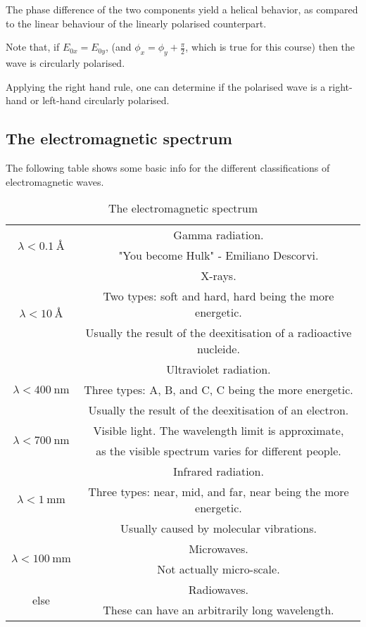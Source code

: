             The phase difference of the two components yield a helical behavior, 
            as compared to the linear behaviour of the linearly polarised counterpart.

            Note that, if $E_{0x} = E_{0y}$, (and $\phi_x = \phi_y + \frac{\pi}{2}$, which is true for this course)
             then the wave is circularly polarised.

            Applying the right hand rule, 
            one can determine if the polarised wave is a right-hand or left-hand circularly polarised.

\subsection{The electromagnetic spectrum}
    The following table shows some basic info for the different classifications of electromagnetic waves.
    \begin{longtable}[c]{@{}c|c@{}} 
        \caption{The electromagnetic spectrum}    
        \endfirsthead
        \hline
        \multirow{2}{*}{$\displaystyle\lambda < \SI{0.1}{\angstrom}$}
         & Gamma radiation. \\
         &"You become Hulk" - Emiliano Descorvi.\\
        \hline    
        \multirow{3}{*}{$\displaystyle\lambda < \SI{10}{\angstrom}$}
         & X-rays. \\
         & Two types: soft and hard, hard being the more energetic. \\
         & Usually the result of the deexitisation of a radioactive nucleide. \\
        \hline
        \multirow{3}{*}{$\displaystyle\lambda < \SI{400}{\nano\metre}$}
         & Ultraviolet radiation. \\
         & Three types: A, B, and C, C being the more energetic. \\
         & Usually the result of the deexitisation of an electron.\\
        \hline
        \multirow{2}{*}{$\displaystyle\lambda < \SI{700}{\nano\metre}$}
         & Visible light. The wavelength limit is approximate, \\
         & as the visible spectrum varies for different people.\\
        \hline
        \multirow{3}{*}{$\displaystyle\lambda < \SI{1}{\milli\metre}$}
         & Infrared radiation. \\
         & Three types: near, mid, and far, near being the more energetic. \\
         & Usually caused by molecular vibrations.\\
        \hline
        \multirow{2}{*}{$\displaystyle\lambda < \SI{100}{\milli\metre}$}
         & Microwaves.\\
         & Not actually micro-scale.\\
        \hline
        \multirow{2}{*}{else}
         & Radiowaves. \\
         & These can have an arbitrarily long wavelength.\\
        \hline
    \end{longtable}

